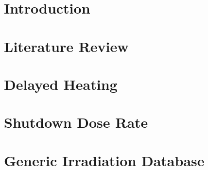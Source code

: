 \documentclass{uiucthesis2021}
\begin{document}
{
    \hypersetup{linkcolor=black}  %
    \tableofcontents
}





\mainmatter

\chapter{Introduction}


\chapter{Literature Review}


\chapter{Delayed Heating}


\chapter{Shutdown Dose Rate}


\chapter{Generic Irradiation Database}

\end{document}
